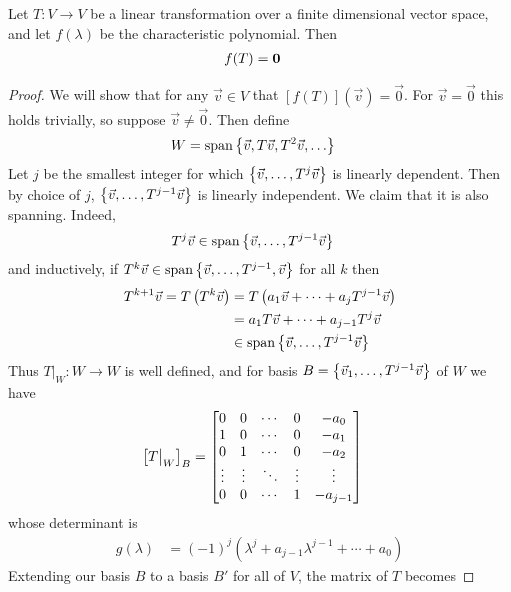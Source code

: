 \begin{theorem}
  Let $T : V \to V$ be a linear transformation over a finite dimensional vector space,
  and let $f(\lambda)$ be the characteristic polynomial. Then
    \begin{align}
      f(T) &= {\bf 0}
    \end{align}
\end{theorem}
\begin{proof}
  We will show that for any $\vec v \in V$ that $\left[f(T)\right](\vec v) = \vec 0$.
  For $\vec v = \vec 0$ this holds trivially, so suppose $\vec v \ne \vec 0$. Then define
  \begin{align}
    W &= \text{span}\left\{\vec v, T\vec v, T^2\vec v, \ldots \right\}
  \end{align}
  Let $j$ be the smallest integer for which $\left\{\vec v,\ldots,T^j\vec v\right\}$ is linearly dependent.
  Then by choice of $j$, $\left\{\vec v,\ldots,T^{j-1}\vec v\right\}$ is linearly independent.
  We claim that it is also spanning. Indeed,
  \begin{align}
    T^j\vec v &\in \text{span}\left\{\vec v,\ldots,T^{j-1}\vec v\right\}
  \end{align}
  and inductively, if $T^k \vec v \in \text{span}\left\{\vec v, \ldots, T^{j-1},\vec v\right\}$ for all $k$ then
  \begin{align}
    T^{k+1}\vec v = T\left(T^k\vec v\right)
      &= T\left(a_1\vec v + \cdots + a_jT^{j-1}\vec v\right) \\
      &= a_1T\vec v + \cdots + a_{j-1}T^{j}\vec v \\
      &\in \text{span}\left\{\vec v,\ldots,T^{j-1}\vec v\right\}
  \end{align}
  Thus $T\big\rvert_{W} : W \to W$ is well defined, and for basis $B = \left\{\vec v_1,\ldots,T^{j-1}\vec v\right\}$ of $W$ we have
  \begin{align}
    \left[T\big\rvert_{W}\right]_B &= \begin{bmatrix}
      0 & 0 & \cdots & 0 & -a_0 \\
      1 & 0 & \cdots & 0 & -a_1 \\
      0 & 1 & \cdots & 0 & -a_2 \\
      \vdots & \vdots & \ddots & \vdots & \vdots \\
      0 & 0 & \cdots & 1 & -a_{j-1} \\
    \end{bmatrix}
  \end{align}
  whose determinant is
  \begin{align}
    g(\lambda) &= (-1)^j(\lambda^j + a_{j-1}\lambda^{j-1} + \cdots + a_0)
  \end{align}
  Extending our basis $B$ to a basis $B'$ for all of $V$, the matrix of $T$ becomes

\end{proof}
